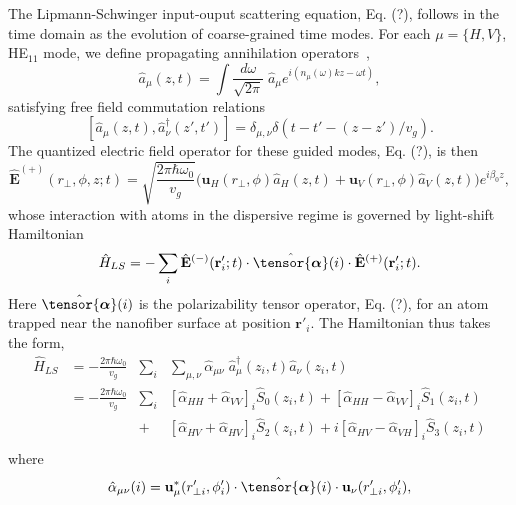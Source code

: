 \documentclass[preprint,aps,pra,onecolumn]{revtex4-1} %
\begin{document}
The Lipmann-Schwinger input-ouput scattering equation, Eq. (?), follows in the time domain as the evolution of coarse-grained time modes.  For each  $\mu =\{H,V\}$, HE$_{11}$ mode, we define propagating annihilation operators~\cite{},
\begin{equation}
\hat{a}_\mu(z,t) = \int \frac{d \omega}{\sqrt{2 \pi}} \; \hat{a}_\mu e^{i(n_\mu(\omega) kz-\omega t)},
\end{equation}
satisfying free field commutation relations
\begin{equation}
\left[\hat{a}_\mu(z,t),\hat{a}^\dag_\nu(z',t')\right]=\delta_{\mu,\nu}  \delta(t-t'-(z-z')/v_g).
\end{equation}
The quantized electric field operator for these guided modes, Eq. (?), is then
\begin{equation}
\hat{\mathbf{E}}^{(+)}(r\!_\perp,\phi,z;t) = \sqrt{ \frac{2 \pi \hbar \omega_0}{ v_g} } \big( \mathbf{u}_H(r\!_\perp,\phi) \hat{a}_H(z,t) + \mathbf{u}_V(r\!_\perp,\phi) \hat{a}_V(z,t) \big) e^{i \beta_0 z},
\end{equation}
whose interaction with atoms in the dispersive regime is governed by  light-shift Hamiltonian~\cite{Deutsch2010a}
\begin{equation}  
	\hat{H}_{LS}   = - \sum_i \hat{\mathbf{E}}^{(-)}(\mathbf{r}'_i ; t ) \cdot \hat{\tensor{\boldsymbol{\alpha}}}(i) \cdot \hat{\mathbf{E}}^{(+)}(\mathbf{r}'_i;t ).
\end{equation}
Here $\hat{\tensor{\boldsymbol{\alpha}}}(i)$ is the polarizability tensor operator, Eq. (?), for an atom trapped near the nanofiber surface at position $\mathbf{r}'_i$. The Hamiltonian thus takes the form,
\begin{align}  
	\hat{H}_{LS}   &= -\frac{2 \pi \hbar \omega_0}{v_g} &\sum_i &\sum_{\mu,\nu} \hat{\alpha}_{\mu \nu}\; \hat{a}_{\mu}^\dag(z_i,t)  \hat{a}_{ \nu}(z_i,t) \\
	&= -\frac{2 \pi \hbar \omega_0}{v_g} &\sum_i &  \left[\hat{\alpha}_{HH}+\hat{\alpha}_{VV} \right]_i \hat{S}_0(z_i,t) +  \left[\hat{\alpha}_{HH}-\hat{\alpha}_{VV} \right]_i \hat{S}_1(z_i,t) \nonumber \\
	&&+ &\left[\hat{\alpha}_{HV}+\hat{\alpha}_{HV} \right]_i \hat{S}_2(z_i,t) + i  \left[\hat{\alpha}_{HV}-\hat{\alpha}_{VH} \right]_i \hat{S}_3(z_i,t)  \nonumber \\
	\end{align}
where
\begin{equation}  
\hat{\alpha}_{\mu \nu}(i)= \mathbf{u}^*_\mu(r'_{\perp i},\phi'_i)  \cdot \hat{\tensor{\boldsymbol{\alpha}}}(i) \cdot \mathbf{u}_\nu(r'_{\perp i},\phi'_i),
\end{equation}
\end{document}
